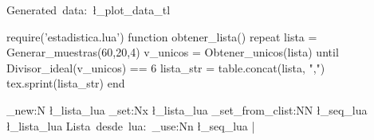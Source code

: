 \documentclass[sin nombre]{plantilla-evaluacion-v1}
\begin{document}


Generated~data:~\l_plot_data_tl \par

\bigskip

 \par

\begin{luacode}
  require('estadistica.lua')
  function obtener_lista()
    repeat
      lista = Generar_muestras(60,20,4)
      v_unicos = Obtener_unicos(lista)
    until Divisor_ideal(v_unicos) == 6
    lista_str = table.concat(lista, ",")
    tex.sprint(lista_str) 
  end
\end{luacode}


\clist_new:N \l_lista_lua
\clist_set:Nx \l_lista_lua {}
\seq_set_from_clist:NN \l_seq_lua \l_lista_lua 
Lista~desde~lua:~\seq_use:Nn \l_seq_lua {|~}

\ExplSyntaxOff
\end{document}

